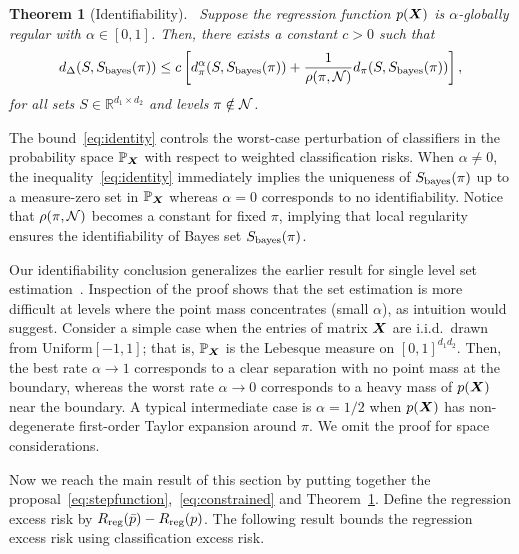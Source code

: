 \documentclass[11pt]{article}
\theoremstyle{plain}
\newtheorem{thm}{Theorem}
\theoremstyle{definition}
\def\bayesS{S_{\textup{bayes}}}
\begin{document}
\begin{thm}[Identifiability]~\label{thm:identifiability} Suppose the regression function $p(\bm X)$ is $\alpha$-globally regular with $\alpha\in[0,1]$. Then, there exists a constant $c>0$ such that
\begin{align}\label{eq:identity}
d_{\Delta}(S,\bayesS(\pi)) \leq c\left[d_\pi^\alpha(S,\bayesS(\pi))+{1\over\rho(\pi, \tN)} d_\pi(S,\bayesS(\pi))\right],
\end{align}
for all sets $S\in\mathbb{R}^{d_1\times d_2}$ and levels $\pi\notin \mathcal{N}$.
\end{thm}

The bound~\eqref{eq:identity} controls the worst-case perturbation of classifiers in the probability space $\mathbb{P}_{\bm X}$ with respect to weighted classification risks. When $\alpha\neq 0$, the inequality~\eqref{eq:identity} immediately implies the uniqueness of $\bayesS(\pi)$ up to a measure-zero set in $\mathbb{P}_{\bm X}$ whereas $\alpha=0$ corresponds to no identifiability.  Notice that $\rho(\pi,\mathcal{N})$ becomes a constant for fixed $\pi$, implying that local regularity ensures the identifiability of Bayes set $\bayesS(\pi)$.


Our identifiability conclusion generalizes the earlier result for single level set estimation~\citep{singh2009adaptive,tsybakov2004optimal}. Inspection of the proof shows that the set estimation is more difficult at levels where the point mass concentrates (small $\alpha$), as intuition would suggest. Consider a simple case when the entries of matrix $\bm X$ are i.i.d.\ drawn from $\text{Uniform}[-1,1]$; that is, $\mathbb{P}_{\bm X}$ is the Lebesque measure on $[0,1]^{d_1d_2}$. Then, the best rate $\alpha\to 1$ corresponds to a clear separation with no point mass at the boundary, whereas the worst rate $\alpha\to 0$ corresponds to a heavy mass of $p(\bm X)$ near the boundary. A typical intermediate case is $\alpha=1/2$ when $p(\bm X)$ has non-degenerate first-order Taylor expansion around $\pi$. We omit the proof for space considerations.

Now we reach the main result of this section by putting together the proposal~\eqref{eq:stepfunction},~\eqref{eq:constrained} and Theorem~\ref{thm:identifiability}. Define the regression excess risk by $R_{\textup{reg}}(\bar p) - R_{\textup{reg}}(p)$.
The following result bounds the regression excess risk using classification excess risk.
\end{document}
